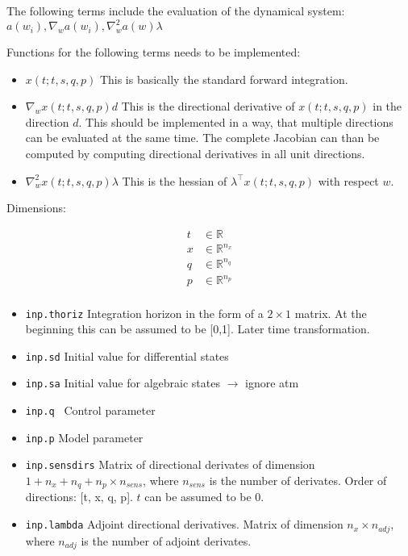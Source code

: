 \documentclass[12pt]{article}
\begin{document}
The following terms include the evaluation of the dynamical system: $a(w_i), \nabla_w a(w_i), \nabla_w^2 a(w)\lambda $

Functions for the following terms needs to be implemented:
\begin{itemize}
  \item $x(t;t,s,q,p)$
        This is basically the standard forward integration.
  \item $\nabla_{w} x(t;t,s,q,p)d$
        This is the directional derivative of $x(t;t,s,q,p)$ in the direction $d$. 
        This should be implemented in a way, that multiple directions can be evaluated at the same time.
        The complete Jacobian can than be computed by computing directional derivatives in all unit directions.
  \item $\nabla^2_{w} x(t;t,s,q,p)\lambda$
        This is the hessian of $\lambda^\top x(t;t,s,q,p)$ with respect $w$.
\end{itemize}


%  

Dimensions:

\begin{align}
  t &\in \mathbb{R}                \\
  x &\in \mathbb{R}^{n_x}         \\
  q &\in \mathbb{R}^{n_q}         \\
  p &\in \mathbb{R}^{n_p}         \\
\end{align}

\begin{itemize}
    \item \texttt{inp.thoriz} Integration horizon in the form of a $2 \times 1$ matrix. At the beginning  this can be assumed to be [0,1]. Later time transformation.
    \item \texttt{inp.sd} Initial value for differential states 
    \item \texttt{inp.sa} Initial value for algebraic states $\rightarrow$ ignore atm
    \item \texttt{inp.q } Control parameter
    \item \texttt{inp.p} Model parameter
    \item \texttt{inp.sensdirs} Matrix of directional derivates of dimension $1+n_x+n_q+n_p \times n_{sens}$, where $n_{sens}$ is the number of derivates.
         Order of directions: [t, x, q, p]. $t$ can be assumed to be 0.
    \item \texttt{inp.lambda} Adjoint directional derivatives. 
           Matrix of dimension $n_x \times n_{adj}$, where $n_{adj}$ is the number of adjoint derivates.
\end{itemize}
\end{document}
